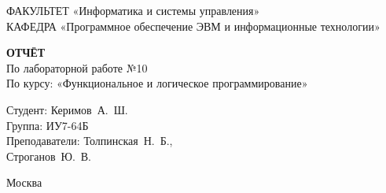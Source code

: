 \begin{titlepage}
{	{\doublespacing \small \raggedright ФАКУЛЬТЕТ \hspace{25mm} «Информатика и системы управления»\\
	КАФЕДРА \hspace{5mm} «Программное обеспечение ЭВМ и информационные технологии»\\}

	\vspace{30mm}

	\textbf{ОТЧЁТ}\\
	По лабораторной работе №10\\
	По курсу: «Функциональное и логическое программирование»\\

	\vspace{60mm}

	\hspace{70mm} Студент:       \hfill Керимов~А.~Ш.\\
	\hspace{70mm} Группа:        \hfill ИУ7-64Б\\
	\hspace{70mm} Преподаватели: \hfill Толпинская~Н.~Б.,\\
	                             \hfill Строганов~Ю.~В.\\

	\vfill

	Москва\\
	\the\year\\}
\end{titlepage}

\setcounter{page}{2}
